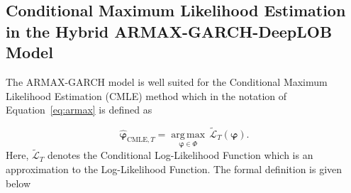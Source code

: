 \documentclass[10pt,a4paper,oneside]{article}
\begin{document}
\subsection{Conditional Maximum Likelihood Estimation in the Hybrid ARMAX-GARCH-DeepLOB Model}
\label{subsec:cmle_props_paper}
The ARMAX-GARCH model is well suited for the Conditional Maximum Likelihood Estimation (CMLE) method which in the notation of Equation~\eqref{eq:armax} is defined as

$$
    \hat{\boldsymbol{\varphi}}_{\mathrm{CMLE}, T} = \underset{\boldsymbol{\varphi} \in \Phi}{\operatorname{arg\,max}} \, \tilde{\mathcal{L}}_{T}(\boldsymbol{\varphi}).
$$
Here, $\tilde{\mathcal{L}}_{T}$ denotes the Conditional Log-Likelihood Function which is an approximation to the Log-Likelihood Function. The formal definition is given below
\end{document}
